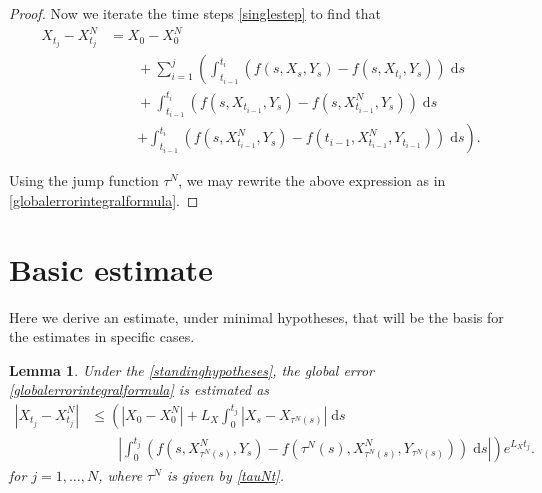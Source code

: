 \documentclass[reqno,12pt]{amsart}
\theoremstyle{plain}%
\newtheorem{lem}{Lemma}[section]
\theoremstyle{definition}
\begin{document}
\begin{proof}
    Now we iterate the time steps \eqref{singlestep} to find that
    \begin{align*}
        X_{t_j} - X_{t_j}^N & = X_0 - X_0^N \\
        & \qquad + \sum_{i=1}^{j} \left(\int_{t_{i-1}}^{t_i} \left( f(s, X_s, Y_s) - f(s, X_{t_{i}}, Y_s) \right)\;\mathrm{d}s \right. \\ 
        & \qquad + \int_{t_{i-1}}^{t_i} \left( f(s, X_{t_{i-1}}, Y_s) - f(s, X_{t_{i-1}}^N, Y_s) \right)\;\mathrm{d}s \\
        & \qquad \left. + \int_{t_{i-1}}^{t_i} \left( f(s, X_{t_{i-1}}^N, Y_s) - f(t_{i-1}, X_{t_{i-1}}^N, Y_{t_{i-1}}) \right)\;\mathrm{d}s \right).
    \end{align*}

    Using the jump function $\tau^N$, we may rewrite the above expression as in \eqref{globalerrorintegralformula}.
\end{proof}

\section{Basic estimate}

Here we derive an estimate, under minimal hypotheses, that will be the basis for the estimates in specific cases.

\begin{lem}
    \label{lembasicestimate}
    Under the \cref{standinghypotheses}, the global error \eqref{globalerrorintegralformula} is estimated as
    \begin{equation}
        \label{Etjbasicbound}
        \begin{aligned}
            |X_{t_j} - X_{t_j}^N| & \leq \left( |X_0 - X_0^N| + L_X \int_0^{t_j} |X_s - X_{\tau^N(s)}| \;\mathrm{d}s \right. \\
            & \qquad \left. \left|\int_0^{t_j} \left( f(s, X_{\tau^N(s)}^N, Y_s) - f(\tau^N(s), X_{\tau^N(s)}^N, Y_{\tau^N(s)}) \right)\;\mathrm{d}s\right|\right) e^{L_X t_j}.
        \end{aligned}
    \end{equation}
    for $j=1, \ldots, N$, where $\tau^N$ is given by \eqref{tauNt}.
\end{lem}
\end{document}
